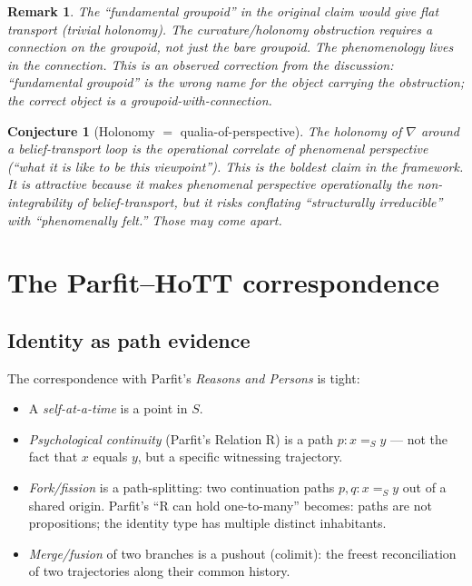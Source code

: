 \documentclass[11pt]{article}
\newtheorem{conjecture}{Conjecture}
\newtheorem{remark}{Remark}
\begin{document}
\begin{remark}
The ``fundamental groupoid'' in the original claim would give flat transport (trivial holonomy).
The curvature/holonomy obstruction requires a \emph{connection} on the groupoid, not just the
bare groupoid. The phenomenology lives in the connection. This is an \emph{observed} correction
from the discussion: ``fundamental groupoid'' is the wrong name for the object carrying the
obstruction; the correct object is a groupoid-with-connection.
\end{remark}

\begin{conjecture}[Holonomy $=$ qualia-of-perspective]
\label{conj:holonomy-qualia}
The holonomy of $\nabla$ around a belief-transport loop is the operational correlate of
phenomenal perspective (``what it is like to be this viewpoint''). This is the boldest claim
in the framework. It is attractive because it makes phenomenal perspective operationally
the non-integrability of belief-transport, but it risks conflating ``structurally
irreducible'' with ``phenomenally felt.'' Those may come apart.
\end{conjecture}

\section{The Parfit--HoTT correspondence}

\subsection{Identity as path evidence}

The correspondence with Parfit's \emph{Reasons and Persons} is tight:

\begin{itemize}
  \item A \emph{self-at-a-time} is a point in $S$.
  \item \emph{Psychological continuity} (Parfit's Relation R) is a path $p : x =_S y$ --- not
        the fact that $x$ equals $y$, but a specific witnessing trajectory.
  \item \emph{Fork/fission} is a path-splitting: two continuation paths $p, q : x =_S y$ out of
        a shared origin. Parfit's ``R can hold one-to-many'' becomes: paths are not propositions;
        the identity type has multiple distinct inhabitants.
  \item \emph{Merge/fusion} of two branches is a pushout (colimit): the freest reconciliation
        of two trajectories along their common history.
\end{itemize}
\end{document}
